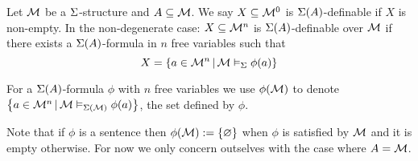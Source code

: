 \begin{dfn}[Definable]
    Let $\mathcal{M}$ be a $\Sigma$-structure and $A \subseteq \mathcal{M}$.
    We say $X \subseteq \mathcal{M}^0$ is $\Sigma(A)$-definable if $X$ is non-empty.
    In the non-degenerate case:
    $X \subseteq {\mathcal{M}}^n$ is $\Sigma(A)$-definable over $\mathcal{M}$ if there exists a 
    $\Sigma(A)$-formula in $n$ free variables such that 
    \[X = \left\{a \in {\mathcal{M}}^n \,|\, \mathcal{M} \vDash_{\Sigma} \phi(a)\right\}\]

    For a $\Sigma(A)$-formula $\phi$ with $n$ free variables we use $\phi(\mathcal{M})$ 
    to denote $\left\{a \in \mathcal{M}^n \,|\, \mathcal{M} \vDash_{\Sigma(\mathcal{M})} \phi(a)\right\}$,
    the set defined by $\phi$.
    
    Note that if $\phi$ is a sentence then 
    $\phi(\mathcal{M}) := \left\{\varnothing\right\}$ when $\phi$ is 
    satisfied by $\mathcal{M}$ and it is empty otherwise.
    For now we only concern outselves with the case where $A = \mathcal{M}$.
\end{dfn}


